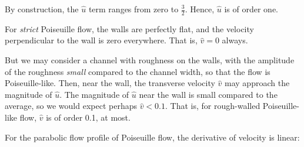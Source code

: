 \documentclass[a4paper]{report}
\begin{document}
\begin{center}
\end{center}


By construction, the $\hat{u}$ term ranges from zero to $\frac{3}{2}$. Hence, $\hat{u}$ is of order one.

For \emph{strict} Poiseuille flow, the walls are perfectly flat, and the velocity perpendicular to the wall is zero everywhere.  That is, $\hat{v} = 0$ always. 

But we may consider a channel with roughness on the walls, with the amplitude of the roughness \emph{small} compared to the channel width, so that the flow is Poiseuille-like.  Then, near the wall, the transverse velocity $\hat{v}$ may approach the magnitude of $\hat{u}$.  The magnitude of $\hat{u}$ near the wall is small compared to the average, so we would expect perhaps $\hat{v} < 0.1$.  That is, for rough-walled Poiseuille-like flow, $\hat{v}$ is of order 0.1, at most.

\vspace{1em}
For the parabolic flow profile of Poiseuille flow, the derivative of velocity is linear:
\begin{center}
\end{center}
\end{document}
